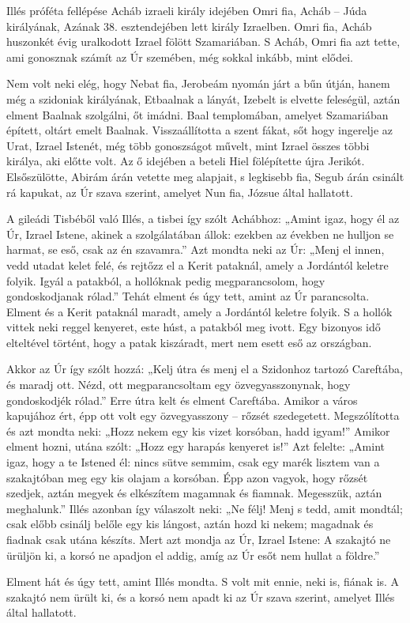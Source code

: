 \documentclass[twoside]{article}
\begin{document}
\begin{lectio}{Illés próféta fellépése Acháb izraeli király idejében}
\noindent Omri fia, Acháb – Júda királyának, Azának 38. esztendejében lett király Izraelben. Omri fia, Acháb huszonkét évig uralkodott Izrael fölött Szamariában. S Acháb, Omri fia azt tette, ami gonosznak számít az Úr szemében, még sokkal inkább, mint elődei.

Nem volt neki elég, hogy Nebat fia, Jerobeám nyomán járt a bűn útján, hanem még a szidoniak királyának, Etbaalnak a lányát, Izebelt is elvette feleségül, aztán elment Baalnak szolgálni, őt imádni. Baal templomában, amelyet Szamariában épített, oltárt emelt Baalnak. Visszaállította a szent fákat, sőt hogy ingerelje az Urat, Izrael Istenét, még több gonoszságot művelt, mint Izrael összes többi királya, aki előtte volt. Az ő idejében a beteli Hiel fölépítette újra Jerikót. Elsőszülötte, Abirám árán vetette meg alapjait, s legkisebb fia, Segub árán csinált rá kapukat, az Úr szava szerint, amelyet Nun fia, Józsue által hallatott.

A gileádi Tisbéből való Illés, a tisbei így szólt Achábhoz: „Amint igaz, hogy él az Úr, Izrael Istene, akinek a szolgálatában állok: ezekben az években ne hulljon se harmat, se eső, csak az én szavamra.” Azt mondta neki az Úr: „Menj el innen, vedd utadat kelet felé, és rejtőzz el a Kerit pataknál, amely a Jordántól keletre folyik. Igyál a patakból, a hollóknak pedig megparancsolom, hogy gondoskodjanak rólad.” Tehát elment és úgy tett, amint az Úr parancsolta. Elment és a Kerit pataknál maradt, amely a Jordántól keletre folyik. S a hollók vittek neki reggel kenyeret, este húst, a patakból meg ivott. Egy bizonyos idő elteltével történt, hogy a patak kiszáradt, mert nem esett eső az országban.

Akkor az Úr így szólt hozzá: „Kelj útra és menj el a Szidonhoz tartozó Careftába, és maradj ott. Nézd, ott megparancsoltam egy özvegyasszonynak, hogy gondoskodjék rólad.” Erre útra kelt és elment Careftába. Amikor a város kapujához ért, épp ott volt egy özvegyasszony – rőzsét szedegetett. Megszólította és azt mondta neki: „Hozz nekem egy kis vizet korsóban, hadd igyam!” Amikor elment hozni, utána szólt: „Hozz egy harapás kenyeret is!” Azt felelte: „Amint igaz, hogy a te Istened él: nincs sütve semmim, csak egy marék lisztem van a szakajtóban meg egy kis olajam a korsóban. Épp azon vagyok, hogy rőzsét szedjek, aztán megyek és elkészítem magamnak és fiamnak. Megesszük, aztán meghalunk.” Illés azonban így válaszolt neki: „Ne félj! Menj s tedd, amit mondtál; csak előbb csinálj belőle egy kis lángost, aztán hozd ki nekem; magadnak és fiadnak csak utána készíts. Mert azt mondja az Úr, Izrael Istene: A szakajtó ne ürüljön ki, a korsó ne apadjon el addig, amíg az Úr esőt nem hullat a földre.”

Elment hát és úgy tett, amint Illés mondta. S volt mit ennie, neki is, fiának is. A szakajtó nem ürült ki, és a korsó nem apadt ki az Úr szava szerint, amelyet Illés által hallatott.
\end{lectio}
\end{document}
